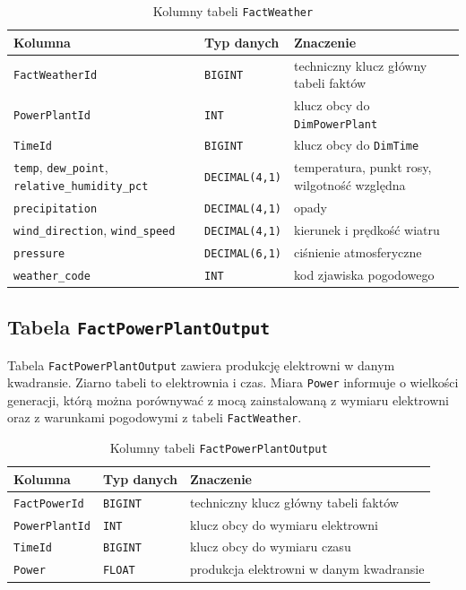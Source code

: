 \documentclass[12pt]{article}
\begin{document}
	\begin{table}[H]
		\centering
		\small
		\begin{tabularx}{\textwidth}{|p{4.3cm}|p{2.4cm}|X|}
			\hline
			\textbf{Kolumna} & \textbf{Typ danych} & \textbf{Znaczenie} \\
			\hline
			\texttt{FactWeatherId} & \texttt{BIGINT} & techniczny klucz główny tabeli faktów \\
			\hline
			\texttt{PowerPlantId} & \texttt{INT} & klucz obcy do \texttt{DimPowerPlant} \\
			\hline
			\texttt{TimeId} & \texttt{BIGINT} & klucz obcy do \texttt{DimTime} \\
			\hline
			\texttt{temp}, \texttt{dew\_point}, \texttt{relative\_humidity\_pct} & \texttt{DECIMAL(4,1)} & temperatura, punkt rosy, wilgotność względna \\
			\hline
			\texttt{precipitation} & \texttt{DECIMAL(4,1)} & opady \\
			\hline
			\texttt{wind\_direction}, \texttt{wind\_speed} & \texttt{DECIMAL(4,1)} & kierunek i prędkość wiatru \\
			\hline
			\texttt{pressure} & \texttt{DECIMAL(6,1)} & ciśnienie atmosferyczne \\
			\hline
			\texttt{weather\_code} & \texttt{INT} & kod zjawiska pogodowego \\
			\hline
		\end{tabularx}
		\caption{Kolumny tabeli \texttt{FactWeather}}
	\end{table}

	\subsection{Tabela \texttt{FactPowerPlantOutput}}

	Tabela \texttt{FactPowerPlantOutput} zawiera produkcję elektrowni w danym kwadransie. Ziarno tabeli to elektrownia i czas. Miara \texttt{Power} informuje o wielkości generacji, którą można porównywać z mocą zainstalowaną z wymiaru elektrowni oraz z warunkami pogodowymi z tabeli \texttt{FactWeather}.

	\begin{table}[H]
		\centering
		\small
		\begin{tabularx}{\textwidth}{|p{3.3cm}|p{2.4cm}|X|}
			\hline
			\textbf{Kolumna} & \textbf{Typ danych} & \textbf{Znaczenie} \\
			\hline
			\texttt{FactPowerId} & \texttt{BIGINT} & techniczny klucz główny tabeli faktów \\
			\hline
			\texttt{PowerPlantId} & \texttt{INT} & klucz obcy do wymiaru elektrowni \\
			\hline
			\texttt{TimeId} & \texttt{BIGINT} & klucz obcy do wymiaru czasu \\
			\hline
			\texttt{Power} & \texttt{FLOAT} & produkcja elektrowni w danym kwadransie \\
			\hline
		\end{tabularx}
		\caption{Kolumny tabeli \texttt{FactPowerPlantOutput}}
	\end{table}
\end{document}
